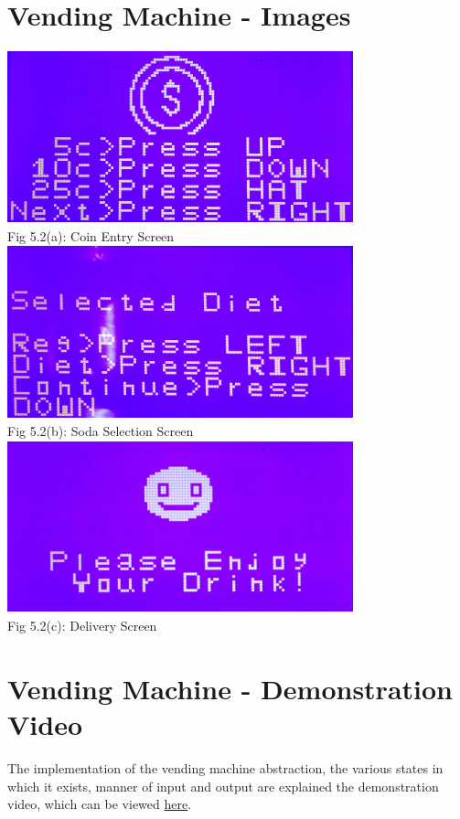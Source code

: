 \documentclass[a4paper,12pt,oneside]{book}
\begin{document}
\section{Vending Machine - Images}
\begin{center}
\includegraphics[width=10cm, height=5cm]{VendingMachineImages/COIN} \\
{\small Fig 5.2(a): Coin Entry Screen} \\
\includegraphics[width=10cm, height=5cm]{VendingMachineImages/SODASELECT} \\
{\small Fig 5.2(b): Soda Selection Screen} \\
\includegraphics[width=10cm, height=5cm]{VendingMachineImages/DELIVERY} \\
{\small Fig 5.2(c): Delivery Screen} \\
\end{center}
\section{Vending Machine - Demonstration Video}
\qquad The implementation of the vending machine abstraction, the various states in which it exists, manner of input and output are explained the demonstration video, which can be viewed \href{https://youtu.be/5H-Cj6h82Ws}{here}.
\end{document}
